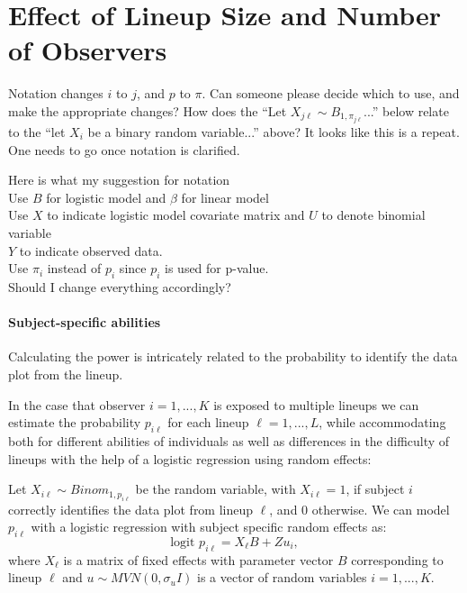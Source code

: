\documentclass{article}
\newcommand{\red}[1]{{\color{red} #1}} %
\newcommand{\green}[1]{{\color{green} #1}} %
\begin{document}
\section{Effect of Lineup Size and Number of Observers}

\green{Notation changes $i$ to $j$, and $p$ to $\pi$. Can someone please decide which to use, and make the appropriate changes? How does the ``Let $X_{j\ell} \sim B_{1, \pi_{j\ell}}$...'' below relate to the ``let $X_i$ be a binary random variable...'' above? It looks like this is a repeat. One needs to go once notation is clarified.}

\red{Here is what my suggestion for notation \\  Use $B$ for logistic model and $\beta$ for linear model \\ Use $X$ to indicate logistic model covariate matrix and $U$ to denote binomial variable \\ $Y$ to indicate observed data. \\ Use $\pi_i$ instead of $p_i$ since $p_i$ is used for p-value.  \\ Should I change everything accordingly? }

\paragraph{Subject-specific abilities}
Calculating the power  is intricately related to the probability to identify the data plot from the lineup. 

In the case that observer  $i = 1, ..., K$ is exposed to multiple lineups we can estimate the probability $p_{i \ell}$ for each lineup $\ell = 1, ..., L$, while accommodating both for different abilities of individuals as well as differences in the difficulty of lineups with the help of a logistic regression using random effects: 


Let $X_{i\ell} \sim Binom_{1, p_{i\ell}}$ be the random variable, with $X_{i\ell}= 1$, if  subject $i$ correctly identifies the data plot from lineup $\ell$, and 0 otherwise.
We can model $p_{i\ell}$ with a logistic regression with subject specific random effects as:
\[
\text{logit } p_{i\ell} = X_\ell B + Z u_i,  
\]
where $X_\ell$ is a matrix of fixed effects with parameter vector $B$ corresponding to lineup $\ell$ and $u \sim MVN(0, \sigma_u I)$  is a vector of random variables $i = 1, ..., K$.
\end{document}
